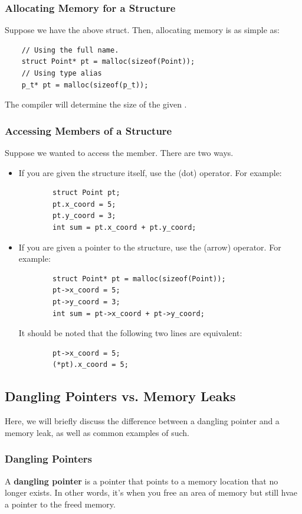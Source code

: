 \documentclass[letterpaper]{article}
\begin{document}
\subsubsection{Allocating Memory for a Structure}
Suppose we have the above  struct. Then, allocating memory is as simple as:
\begin{verbatim}
    // Using the full name.
    struct Point* pt = malloc(sizeof(Point));
    // Using type alias 
    p_t* pt = malloc(sizeof(p_t)); 
\end{verbatim}
The compiler will determine the size of the given . 

\subsubsection{Accessing Members of a Structure}
Suppose we wanted to access the  member. There are two ways.
\begin{itemize}
    \item If you are given the structure itself, use the  (dot) operator. For example:
    \begin{verbatim}
        struct Point pt; 
        pt.x_coord = 5;
        pt.y_coord = 3;
        int sum = pt.x_coord + pt.y_coord;
    \end{verbatim}

    \item If you are given a pointer to the structure, use the \code{->} (arrow) operator. For example:
    \begin{verbatim}
        struct Point* pt = malloc(sizeof(Point));
        pt->x_coord = 5;
        pt->y_coord = 3;
        int sum = pt->x_coord + pt->y_coord;
    \end{verbatim}
    It should be noted that the following two lines are equivalent:
    \begin{verbatim}
        pt->x_coord = 5;
        (*pt).x_coord = 5;
    \end{verbatim}
\end{itemize}

\subsection{Dangling Pointers vs. Memory Leaks}
Here, we will briefly discuss the difference between a dangling pointer and a memory leak, as well as common examples of such. 

\subsubsection{Dangling Pointers}
A \textbf{dangling pointer} is a pointer that points to a memory location that no longer exists. In other words, it's when you free an area of memory but still hvae a pointer to the freed memory. 
\end{document}
